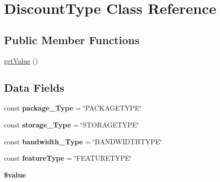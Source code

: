 \hypertarget{class_discount_type}{\section{Discount\+Type Class Reference}
\label{class_discount_type}
}
\subsection*{Public Member Functions}
\begin{DoxyCompactItemize}
\item 
\hyperlink{class_discount_type_ac0bc18784b182c89fcfd276625aef435}{get\+Value} ()
\end{DoxyCompactItemize}
\subsection*{Data Fields}
\begin{DoxyCompactItemize}
\item 
\hypertarget{class_discount_type_a5ac05209705c7d9ad4a4a4b8a0b7f2ff}{const {\bfseries package\+\_\+\+Type} = \char`\"{}P\+A\+C\+K\+A\+G\+E\+T\+Y\+P\+E\char`\"{}}\label{class_discount_type_a5ac05209705c7d9ad4a4a4b8a0b7f2ff}

\item 
\hypertarget{class_discount_type_a724bd13092f809b95f912a8bd77239fe}{const {\bfseries storage\+\_\+\+Type} = \char`\"{}S\+T\+O\+R\+A\+G\+E\+T\+Y\+P\+E\char`\"{}}\label{class_discount_type_a724bd13092f809b95f912a8bd77239fe}

\item 
\hypertarget{class_discount_type_a8f59dfda8f4c9e188a403a7fe31c5bf4}{const {\bfseries bandwidth\+\_\+\+Type} = \char`\"{}B\+A\+N\+D\+W\+I\+D\+T\+H\+T\+Y\+P\+E\char`\"{}}\label{class_discount_type_a8f59dfda8f4c9e188a403a7fe31c5bf4}

\item 
\hypertarget{class_discount_type_aaa795055480a73bee7f74e0a42c06be7}{const {\bfseries feature\+Type} = \char`\"{}F\+E\+A\+T\+U\+R\+E\+T\+Y\+P\+E\char`\"{}}\label{class_discount_type_aaa795055480a73bee7f74e0a42c06be7}

\item 
\hypertarget{class_discount_type_a0f298096f322952a72a50f98a74c7b60}{{\bfseries \$value}}\label{class_discount_type_a0f298096f322952a72a50f98a74c7b60}

\end{DoxyCompactItemize}


